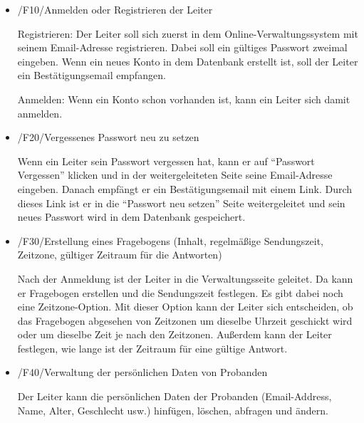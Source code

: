 \documentclass[a4paper]{scrreprt}
\begin{document}
        \begin{itemize}
            \item /F10/Anmelden oder Registrieren der Leiter
            	\par Registrieren: Der Leiter soll sich zuerst in dem Online-Verwaltungssystem mit seinem Email-Adresse registrieren. Dabei soll ein gültiges Passwort zweimal eingeben. Wenn ein neues Konto in dem Datenbank erstellt ist, soll der Leiter ein Bestätigungsemail empfangen.\par
Anmelden: Wenn ein Konto schon vorhanden ist, kann ein Leiter sich damit anmelden.
        \end{itemize}
        
        \begin{itemize}
            \item /F20/Vergessenes Passwort neu zu setzen
            	\par Wenn ein Leiter sein Passwort vergessen hat, kann er auf “Passwort Vergessen” klicken und in der weitergeleiteten Seite seine Email-Adresse eingeben. Danach empfängt er ein Bestätigungsemail mit einem Link. Durch dieses Link ist er in die “Passwort neu setzen” Seite weitergeleitet und sein neues Passwort wird in dem Datenbank gespeichert.

        \end{itemize}
        
        \begin{itemize}
            \item /F30/Erstellung eines Fragebogens (Inhalt, regelmäßige Sendungszeit, Zeitzone, gültiger Zeitraum für die Antworten)

            	\par Nach der Anmeldung ist der Leiter in die Verwaltungsseite geleitet. Da kann er Fragebogen erstellen und die Sendungszeit festlegen. Es gibt dabei noch eine Zeitzone-Option. Mit dieser Option kann der Leiter sich entscheiden, ob das Fragebogen abgesehen von Zeitzonen um dieselbe Uhrzeit geschickt wird oder um dieselbe Zeit je nach den Zeitzonen. Außerdem kann der Leiter festlegen, wie lange ist der Zeitraum für eine gültige Antwort.
                
        \end{itemize}
        
        \begin{itemize}
            \item /F40/Verwaltung der persönlichen Daten von Probanden

            	\par Der Leiter kann die persönlichen Daten der Probanden (Email-Address, Name, Alter, Geschlecht usw.) hinfügen, löschen, abfragen und ändern.

        \end{itemize}
        
\end{document}
